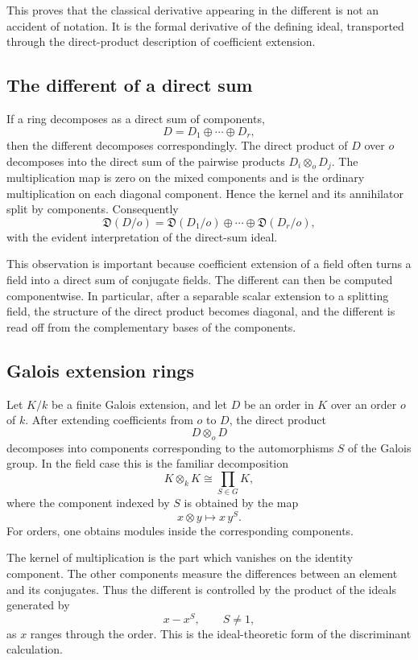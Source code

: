 \documentclass[11pt]{article}
\begin{document}
This proves that the classical derivative appearing in the different is not an accident of notation. It is the formal derivative of the defining ideal, transported through the direct-product description of coefficient extension.

\subsection{The different of a direct sum}

If a ring decomposes as a direct sum of components,
\[
  D=D_1\oplus\cdots\oplus D_r,
\]
then the different decomposes correspondingly. The direct product of \(D\) over \(o\) decomposes into the direct sum of the pairwise products \(D_i\otimes_o D_j\). The multiplication map is zero on the mixed components and is the ordinary multiplication on each diagonal component. Hence the kernel and its annihilator split by components. Consequently
\[
  \mathfrak D(D/o)=\mathfrak D(D_1/o)\oplus\cdots\oplus\mathfrak D(D_r/o),
\]
with the evident interpretation of the direct-sum ideal.

This observation is important because coefficient extension of a field often turns a field into a direct sum of conjugate fields. The different can then be computed componentwise. In particular, after a separable scalar extension to a splitting field, the structure of the direct product becomes diagonal, and the different is read off from the complementary bases of the components.

\subsection{Galois extension rings}

Let \(K/k\) be a finite Galois extension, and let \(D\) be an order in \(K\) over an order \(o\) of \(k\). After extending coefficients from \(o\) to \(D\), the direct product
\[
  D\otimes_o D
\]
decomposes into components corresponding to the automorphisms \(S\) of the Galois group. In the field case this is the familiar decomposition
\[
  K\otimes_k K \cong \prod_{S\in G} K,
\]
where the component indexed by \(S\) is obtained by the map
\[
  x\otimes y\longmapsto x\,y^S.
\]
For orders, one obtains modules inside the corresponding components.

The kernel of multiplication is the part which vanishes on the identity component. The other components measure the differences between an element and its conjugates. Thus the different is controlled by the product of the ideals generated by
\[
  x-x^S,
  \qquad S\ne 1,
\]
as \(x\) ranges through the order. This is the ideal-theoretic form of the discriminant calculation.
\end{document}
